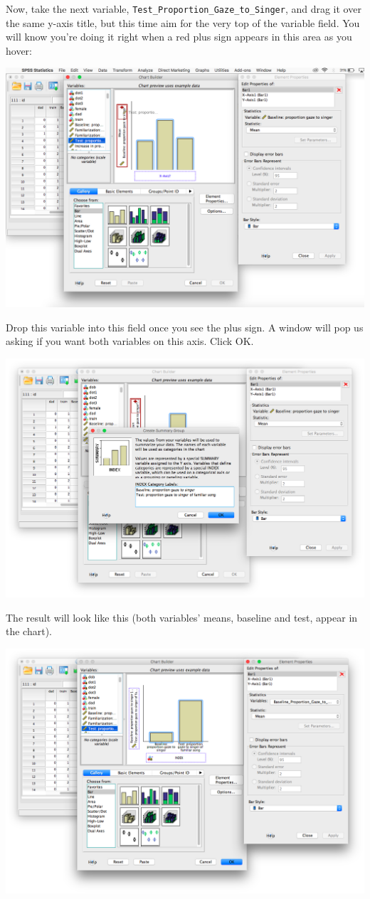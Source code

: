 \documentclass[
]{book}
\begin{document}
Now, take the next variable, \texttt{Test\_Proportion\_Gaze\_to\_Singer}, and drag it over the same y-axis title, but this time aim for the very top of the variable field. You will know you're doing it right when a red plus sign appears in this area as you hover:

\includegraphics{img/6.4.25.png}

Drop this variable into this field once you see the plus sign. A window will pop us asking if you want both variables on this axis. {Click OK}.

\includegraphics{img/6.4.26.png}

The result will look like this (both variables' means, baseline and test, appear in the chart).

\includegraphics{img/6.4.27.png}
\end{document}
